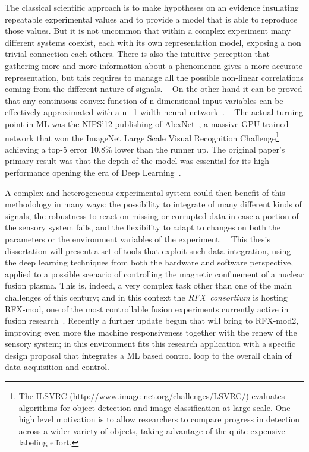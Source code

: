 The classical scientific approach is to make hypotheses on an evidence insulating repeatable experimental values and to provide a model that is able to reproduce those values. But it is not uncommon that within a complex experiment many different systems coexist, each with its own representation model, exposing a non trivial connection each others. There is also the intuitive perception that gathering more and more information about a phenomenon gives a more accurate representation, but this requires to manage all the possible non-linear correlations coming from the different nature of signals.
~
On the other hand it can be proved that any continuous convex function of n-dimensional input variables can be effectively approximated with a n+1 width neural network~\cite{csaji2001approximation}\cite{hanin2017universal}.
~
The actual turning point in ML was the NIPS'12 publishing of AlexNet~\cite{NIPS2012_4824}, a massive GPU trained network that won the ImageNet Large Scale Visual Recognition Challenge\footnote{The ILSVRC (\url{http://www.image-net.org/challenges/LSVRC/}) evaluates algorithms for object detection and image classification at large scale. One high level motivation is to allow researchers to compare progress in detection across a wider variety of objects, taking advantage of the quite expensive labeling effort.} achieving a top-5 error 10.8\% lower than the runner up. 
The original paper's primary result was that the depth of the model was essential for its high performance opening the era of Deep Learning~\cite{Goodfellow-et-al-2016}.

A complex and heterogeneous experimental system could then benefit of this methodology in many ways: the possibility to integrate of many different kinds of signals, the robustness to react on missing or corrupted data in case a portion of the sensory system fails, and the flexibility to adapt to changes on both the parameters or the environment variables of the experiment.
~
This thesis dissertation will present a set of tools that exploit such data integration, using the deep learning techniques from both the hardware and software perspective, applied to a possible scenario of controlling the magnetic confinement of a nuclear fusion plasma. 
%
This is, indeed, a very complex task other than one of the main challenges of this century; and in this context the \textit{RFX~consortium} is hosting RFX-mod, one of the most controllable fusion experiments currently active in fusion research~\cite{SONATO2003161}\cite{doi:10.1063/1.4806765}.
Recently a further update begun that will bring to RFX-mod2, improving even more the machine responsiveness together with the renew of the sensory system; in this environment fits this research application with a specific design proposal that integrates a \ac{ML} based control loop to the overall chain of data acquisition and control.

